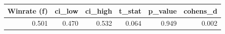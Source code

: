\begin{tabular}{rrrrrr}
\toprule
Winrate (f) & ci\_low & ci\_high & t\_stat & p\_value & cohens\_d \\
\midrule
0.501 & 0.470 & 0.532 & 0.064 & 0.949 & 0.002 \\
\bottomrule
\end{tabular}
